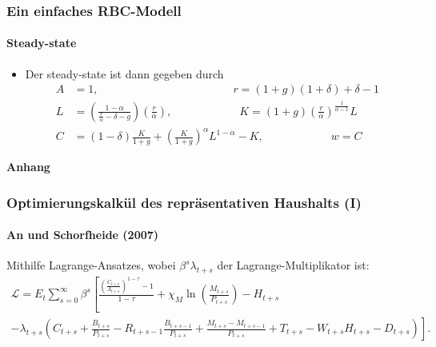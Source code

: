 \documentclass[10pt]{beamer}  %
\begin{document}
\begin{frame}\frametitle{Ein einfaches RBC-Modell}\framesubtitle{Steady-state}
\begin{itemize}
\item Der steady-state ist dann gegeben durch
\begin{align*}
  A &=1, \qquad \qquad\qquad\qquad \qquad\qquad r =(1+g)(1+\delta) + \delta -1\\
  L &= \left(\frac{1-\alpha}{\frac{r}{\alpha}-\delta-g}\right) \left(\frac{r}{\alpha}\right),\qquad \qquad\qquad
  K = (1+g)\left(\frac{r}{\alpha}\right)^{\frac{1}{\alpha-1}} L\\
  C &= (1-\delta) \frac{K}{1+g} + \left(\frac{K}{1+g}\right)^\alpha L ^{1-\alpha} - K, \qquad \qquad\qquad
  w = C
\end{align*}
\end{itemize}
\end{frame}



\appendix
\begin{frame}
\centering \Huge
  \textbf{Anhang}
\end{frame}
\begin{frame}\label{app:OptimHH}
\frametitle{Optimierungskalk\"{u}l des repr\"{a}sentativen Haushalts (I)}\framesubtitle{An und Schorfheide (2007)}
Mithilfe Lagrange-Ansatzes, wobei $\beta^s\lambda_{t+s}$ der Lagrange-Multiplikator ist:
\small
\begin{multline*}
\mathcal{L} = E_t \sum_{s=0}^\infty \beta^s \left[\frac{\left(\frac{C_{t+s}}{A_{t+s}}\right)^{1-\tau}-1}{1-\tau} + \chi_M \ln\left(\frac{M_{t+s}}{P_{t+s}}\right) - H_{t+s}\right.\\
\left. -\lambda_{t+s} \left(C_{t+s}+\frac{B_{t+s}}{P_{t+s}}-
R_{t+s-1}\frac{B_{t+s-1}}{P_{t+s}}+\frac{M_{t+s}-M_{t+s-1}}{P_{t+s}}+T_{t+s}-W_{t+s}
H_{t+s} - D_{t+s}\right) \right].
\end{multline*}
\hyperlink{OptimHH}{}
\end{frame}
\end{document}
